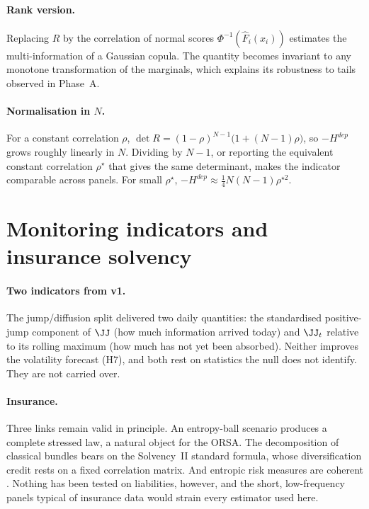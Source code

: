 \paragraph{Rank version.} Replacing $R$ by the correlation of normal scores
$\Phi^{-1}(\hat F_i(x_i))$ estimates the multi-information of a Gaussian copula.
The quantity becomes invariant to any monotone transformation of the marginals,
which explains its robustness to tails observed in Phase~A.

\paragraph{Normalisation in $N$.} For a constant correlation $\rho$,
$\det R=(1-\rho)^{N-1}\big(1+(N-1)\rho\big)$, so $-H^{dep}$ grows roughly linearly
in $N$. Dividing by $N-1$, or reporting the equivalent constant correlation
$\rho^\star$ that gives the same determinant, makes the indicator comparable
across panels. For small $\rho^\star$,
$-H^{dep}\approx\tfrac14N(N-1)\rho^{\star2}$.

\section{Monitoring indicators and insurance solvency}
\label{sec:monitoring}

\paragraph{Two indicators from v1.} The jump/diffusion split delivered two daily
quantities: the standardised positive-jump component of $\JJ$ (how much
information arrived today) and $\JJ_t$ relative to its rolling maximum (how much
has not yet been absorbed). Neither improves the volatility forecast (H7), and
both rest on statistics the null does not identify. They are not carried over.

\paragraph{Insurance.} Three links remain valid in principle. An entropy-ball
scenario produces a complete stressed law, a natural object for the ORSA. The
decomposition of classical bundles bears on the Solvency~II standard formula,
whose diversification credit rests on a fixed correlation matrix. And entropic
risk measures are coherent \citep{ahmadijavid2012,artzner1999}. Nothing has been
tested on liabilities, however, and the short, low-frequency panels typical of
insurance data would strain every estimator used here.

